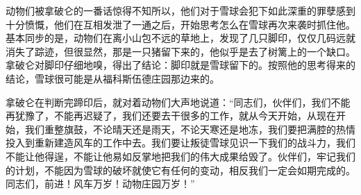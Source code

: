 动物们被拿破仑的一番话惊得不知所以，他们对于雪球会犯下如此深重的罪孽感到十分愤慨，他们在互相发泄了一通之后，开始思考怎么在雪球再次来袭时抓住他。基本同步的是，动物们在离小山包不远的草地上，发现了几只脚印，仅仅几码远就消失了踪迹，但很显然，那是一只猪留下来的，他似乎是去了树篱上的一个缺口。拿破仑对脚印仔细地嗅，得出了结论：脚印就是雪球留下的。按照他的思考得来的结论，雪球很可能是从福科斯伍德庄园那边来的。

拿破仑在判断完蹄印后，就对着动物们大声地说道：“同志们，伙伴们，我们不能再犹豫了，不能再迟疑了，我们还要去干很多的工作，就从今天开始，从现在开始，我们重整旗鼓，不论晴天还是雨天，不论天寒还是地冻，我们要把满腔的热情投入到重新建造风车的工作中去。我们要让叛徒雪球见识一下我们的战斗力，我们不能让他得逞，不能让他易如反掌地把我们的伟大成果给毁了。伙伴们，牢记我们的计划，不能因为雪球的破坏就使它有任何的变动，相反我们一定会如期完成的。同志们，前进！风车万岁！动物庄园万岁！”
